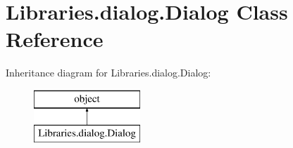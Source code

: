\hypertarget{class_libraries_1_1dialog_1_1_dialog}{}\section{Libraries.\+dialog.\+Dialog Class Reference}
\label{class_libraries_1_1dialog_1_1_dialog}
Inheritance diagram for Libraries.\+dialog.\+Dialog\+:\begin{figure}[H]
\begin{center}
\leavevmode
\includegraphics[height=2.000000cm]{class_libraries_1_1dialog_1_1_dialog}
\end{center}
\end{figure}
